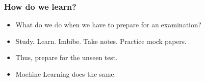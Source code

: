 
%



\begin{frame}[fragile]\frametitle{How do we learn?}
\begin{itemize}
	\item What do we do when we have to prepare for an examination? 
	\item Study. Learn. Imbibe. Take notes. Practice mock papers.
	\item  Thus,  prepare for the unseen test.
	\item Machine Learning does the same.
\end{itemize}
\end{frame}



